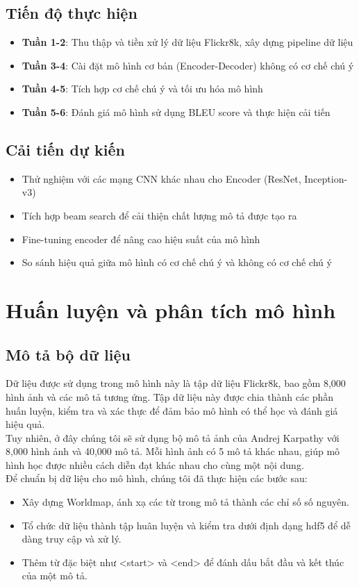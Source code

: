\documentclass[conference]{IEEEtran}
\begin{document}
\subsection{Tiến độ thực hiện}
\begin{itemize}
    \item \textbf{Tuần 1-2}: Thu thập và tiền xử lý dữ liệu Flickr8k, xây dựng pipeline dữ liệu
    \item \textbf{Tuần 3-4}: Cài đặt mô hình cơ bản (Encoder-Decoder) không có cơ chế chú ý
    \item \textbf{Tuần 4-5}: Tích hợp cơ chế chú ý và tối ưu hóa mô hình
    \item \textbf{Tuần 5-6}: Đánh giá mô hình sử dụng BLEU score và thực hiện cải tiến
\end{itemize}

\subsection{Cải tiến dự kiến}
\begin{itemize}
    \item Thử nghiệm với các mạng CNN khác nhau cho Encoder (ResNet, Inception-v3)
    \item Tích hợp beam search để cải thiện chất lượng mô tả được tạo ra
    \item Fine-tuning encoder để nâng cao hiệu suất của mô hình
    \item So sánh hiệu quả giữa mô hình có cơ chế chú ý và không có cơ chế chú ý
\end{itemize}

\section{Huấn luyện và phân tích mô hình}
\subsection{Mô tả bộ dữ liệu}

Dữ liệu được sử dụng trong mô hình này là tập dữ liệu Flickr8k, bao gồm 8,000 hình ảnh và các mô tả tương ứng. Tập dữ liệu này được chia thành các phần huấn luyện, kiểm tra và xác thực để đảm bảo mô hình có thể học và đánh giá hiệu quả.\\
Tuy nhiên, ở đây chúng tôi sẽ sử dụng bộ mô tả ảnh của Andrej Karpathy \cite{pytorch_tutorial} với 8,000 hình ảnh và 40,000 mô tả. Mỗi hình ảnh có 5 mô tả khác nhau, giúp mô hình học được nhiều cách diễn đạt khác nhau cho cùng một nội dung.\\
Để chuẩn bị dữ liệu cho mô hình, chúng tôi đã thực hiện các bước sau:
\begin{itemize}
    \item Xây dựng Worldmap, ánh xạ các từ trong mô tả thành các chỉ số số nguyên.
    \item Tổ chức dữ liệu thành tập huân luyện và kiểm tra dưới định dạng hdf5 để dễ dàng truy cập và xử lý.
    \item Thêm từ đặc biệt như <start> và <end> để đánh dấu bắt đầu và kết thúc của một mô tả.
\end{itemize}
\end{document}
